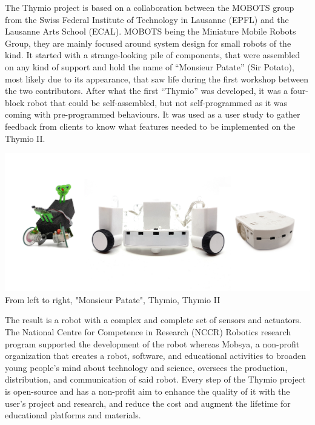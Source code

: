 \documentclass{scrartcl}
\begin{document}
The Thymio project is based on a collaboration between the MOBOTS group from the Swiss Federal Institute of Technology in Lausanne (EPFL) and the Lausanne Arts School (ECAL).
MOBOTS being the Miniature Mobile Robots Group, they are mainly focused around system design for small robots of the kind. It started with a strange-looking pile of components, 
that were assembled on any kind of support and hold the name of “Monsieur Patate” (Sir Potato), most likely due to its appearance, 
that saw life during the first workshop between the two contributors. After what the first “Thymio” was developed, 
it was a four-block robot that could be self-assembled, but not self-programmed as it was coming with pre-programmed behaviours. 
It was used as a user study to gather feedback from clients to know what features needed to be implemented on the Thymio II.\\

\begin{center}
  \includegraphics[width=\textwidth]{prototype_thymio_old}\\
  From left to right, "Monsieur Patate", Thymio, Thymio II
\end{center}

The result is a robot with a complex and complete set of sensors and actuators. 
The National Centre for Competence in Research (NCCR) Robotics research program supported the development of the robot whereas Mobsya, 
a non-profit organization that creates a robot, software, and educational activities to broaden young people's mind about technology and science, 
oversees the production, distribution, and communication of said robot. 
Every step of the Thymio project is open-source and has a non-profit aim to enhance the quality of it with the user's project and research, 
and reduce the cost and augment the lifetime for educational platforms and materials.
\end{document}
